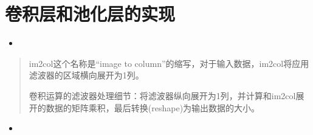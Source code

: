 \documentclass[letterpaper,10pt,english]{sphinxmanual}
\begin{document}
\section{卷积层和池化层的实现}
\label{\detokenize{_u5377_u79ef_u795e_u7ecf_u7f51_u7edc:id5}}\begin{itemize}
\item {} 

\end{itemize}
\begin{quote}

im2col这个名称是“image to column”的缩写，对于输入数据，im2col将应用滤波器的区域横向展开为1列。


卷积运算的滤波器处理细节：将滤波器纵向展开为1列，并计算和im2col展开的数据的矩阵乘积，最后转换(reshape)为输出数据的大小。
\end{quote}
\begin{itemize}
\item {} 

\end{itemize}
\end{document}
